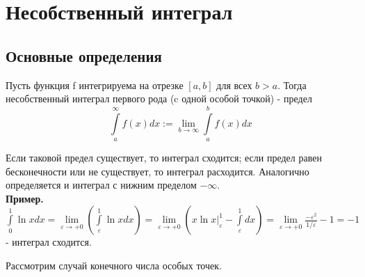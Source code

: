 \chapter{Несобственный интеграл}
\section{Основные определения}
\begin{defin}
Пусть функция f интегрируема на отрезке $[a,b]$ для всех  $b>a$. 
Тогда несобственный интеграл первого рода (c одной особой точкой) - предел 
$$\int\limits_{a}^{\infty}f(x)dx:=\lim\limits_{b\to\infty}\int\limits_{a}^{b}
f(x)dx$$
\end{defin}
Если таковой предел существует, то интеграл сходится; если предел равен 
бесконечности или не существует, то интеграл расходится. Аналогично
определяется и интеграл с нижним пределом $-\infty$.\\
\textbf{Пример.} $\int\limits_{0}^{1} \ln xdx=\lim\limits_{\varepsilon \to 
+0} \left( \int\limits_{\varepsilon}^{1}\ln xdx\right)=
\lim\limits_{\varepsilon \to +0}\left( x\ln x\big|_\varepsilon^1-
\int\limits_{\varepsilon}^1dx  \right)=\lim\limits_{\varepsilon \to +0}
\frac{-\varepsilon^2}{1 /\varepsilon}-1=-1$ - интеграл сходится.

Рассмотрим случай конечного числа особых точек.
